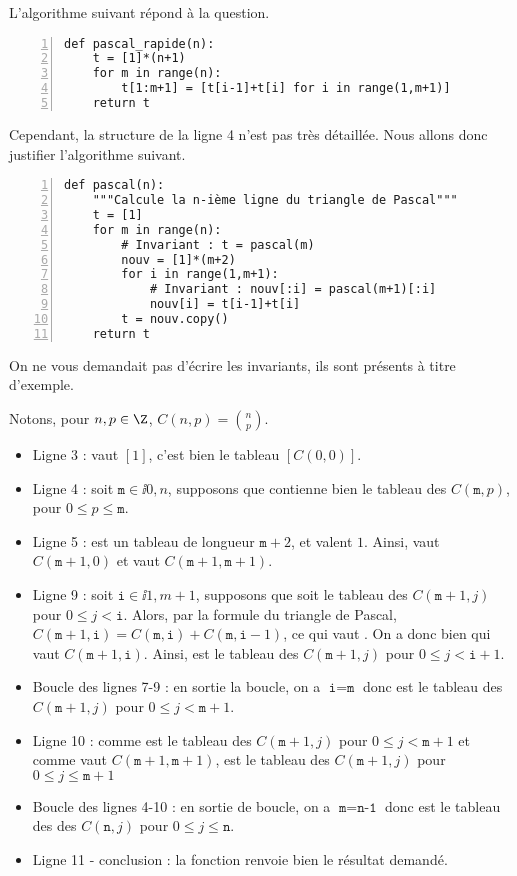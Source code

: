 L'algorithme suivant répond à la question. 
\begin{Verbatim}[gobble=0,numbers=left]
def pascal_rapide(n):
    t = [1]*(n+1)
    for m in range(n):
        t[1:m+1] = [t[i-1]+t[i] for i in range(1,m+1)]
    return t
\end{Verbatim}
Cependant, la structure de la ligne 4 n'est pas très détaillée. Nous allons donc justifier l'algorithme suivant. 
\begin{Verbatim}[gobble=0,numbers=left]
def pascal(n):
    """Calcule la n-ième ligne du triangle de Pascal"""
    t = [1]
    for m in range(n):
        # Invariant : t = pascal(m)
        nouv = [1]*(m+2)
        for i in range(1,m+1):
            # Invariant : nouv[:i] = pascal(m+1)[:i]
            nouv[i] = t[i-1]+t[i]
        t = nouv.copy()
    return t
\end{Verbatim}
\begin{rem}
  On ne vous demandait pas d'écrire les invariants, ils sont présents à titre d'exemple. 
\end{rem}
Notons, pour $n,p\in\Z$, $\displaystyle C(n,p) = \binom{n}{p}$.
\begin{itemize}
  \item[\textbullet] Ligne 3 :  vaut $[1]$, c'est bien le tableau $[C(0,0)]$.
  \item[\textbullet] Ligne 4 : soit $\texttt{m} \in \ii{0,n}$, supposons que  contienne bien le tableau des $C(\texttt{m},p)$, pour $0\leq p \leq \texttt{m}$. 
  \item[\textbullet] Ligne 5 :  est un tableau de longueur $\texttt{m}+2$,  et  valent $1$. 
    Ainsi,  vaut $C(\texttt{m}+1,0)$ et  vaut $C(\texttt{m}+1,\texttt{m}+1)$.
  \item[\textbullet] Ligne 9 : soit $\texttt{i} \in \ii{1,m+1}$, supposons que  soit le tableau des $C(\texttt{m}+1,j)$ pour $0\leq j < \texttt{i}$. 
    Alors, par la formule du triangle de Pascal, $C(\texttt{m}+1,\texttt{i}) = C(\texttt{m},\texttt{i}) + C(\texttt{m},\texttt{i}-1)$, ce qui vaut . 
    On a donc bien  qui vaut $C(\texttt{m}+1,\texttt{i})$. Ainsi,  est le tableau des $C(\texttt{m}+1,j)$ pour $0\leq j < \texttt{i}+1$. 
  \item[\textbullet] Boucle des lignes 7-9 : en sortie la boucle, on a $\texttt{i} = \texttt{m}$ donc  est le tableau des $C(\texttt{m}+1,j)$ pour $0\leq j < \texttt{m}+1$. 
  \item[\textbullet] Ligne 10 : comme  est le tableau des $C(\texttt{m}+1,j)$ pour $0\leq j < \texttt{m}+1$ et comme  vaut $C(\texttt{m}+1,\texttt{m}+1)$,  est le tableau des $C(\texttt{m}+1,j)$ pour $0\leq j \leq \texttt{m}+1$
  \item[\textbullet] Boucle des lignes 4-10 : en sortie de boucle, on a $\texttt{m} = \texttt{n-1}$ donc   est le tableau des des $C(\texttt{n},j)$ pour $0\leq j \leq \texttt{n}$. 
  \item[\textbullet] Ligne 11 - conclusion : la fonction renvoie bien le résultat demandé.
\end{itemize}